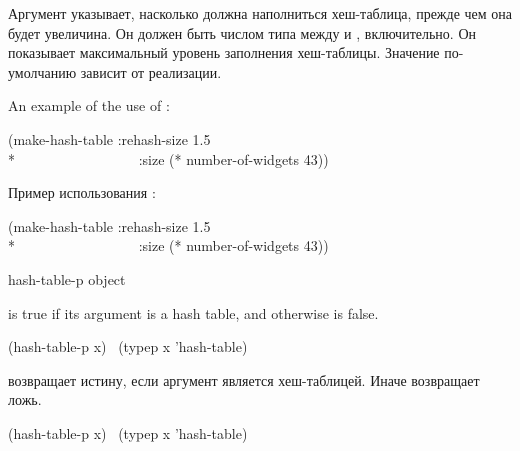\begin{defun}[Function]
\begin{newer}
Аргумент  указывает, насколько должна наполниться
хеш-таблица, прежде чем она будет увеличина. Он должен быть числом типа
 между  и , включительно.
Он показывает максимальный уровень заполнения хеш-таблицы.
Значение по-умолчанию зависит от реализации.
\end{newer}

An example of the use of :
\begin{lisp}
(make-hash-table :rehash-size 1.5 \\*
~~~~~~~~~~~~~~~~~:size (* number-of-widgets 43))
\end{lisp}

Пример использования :
\begin{lisp}
(make-hash-table :rehash-size 1.5 \\*
~~~~~~~~~~~~~~~~~:size (* number-of-widgets 43))
\end{lisp}
\end{defun}

\begin{defun}[Function]
hash-table-p object

 is true if its argument is a hash table,
and otherwise is false.
\begin{lisp}
(hash-table-p x) \EQ\ (typep x 'hash-table)
\end{lisp}

 возвращает истину, если аргумент является хеш-таблицей. Иначе
возвращает ложь.
\begin{lisp}
(hash-table-p x) \EQ\ (typep x 'hash-table)
\end{lisp}
\end{defun}

